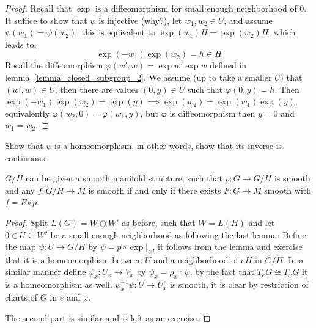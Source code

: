 \begin{proof}
	Recall that $\exp$ is a diffeomorphism for small enough neighborhood of $0$.
	It suffice to show that $\psi$ is injective (why?), let $w_1, w_2 \in U$, and assume $\psi(w_1) = \psi(w_2)$, this is equivalent to $\exp(w_1) H = \exp(w_2) H$, which leads to,
	\[
		\exp(-w_1) \exp(w_2)
		= h
		\in H
	\]
	Recall the diffeomorphism $\varphi(w', w) = \exp w' \exp w$ defined in lemma\ \ref{lemma_closed_subgroup_2}.
	We assume (up to take a smaller $U$) that $(w', w) \in U$, then there are values $(0, y) \in U$ such that $\varphi(0, y) = h$.
	Then $\exp(-w_1) \exp(w_2) = \exp(y) \implies \exp(w_2) = \exp(w_1) \exp(y)$, equivalently $\varphi(w_2, 0) = \varphi(w_1, y)$, but $\varphi$ is diffeomorphism then $y = 0$ and $w_1 = w_2$.
\end{proof}
\begin{exercise}
	Show that $\psi$ is a homeomorphism, in other words, show that its inverse is continuous.
\end{exercise}
\begin{proposition}
	$G / H$ can be given a smooth manifold structure, such that $p : G \to G / H$ is smooth and any $f : G / H \to M$ is smooth if and only if there exists $F : G \to M$ smooth with $f = F \circ p$.
\end{proposition}
\begin{proof}
	Split $L(G) = W \oplus W'$ as before, such that $W = L(H)$ and let $0 \in U \subseteq W'$ be a small enough neighborhood as following the last lemma.
	Define the map $\psi : U \to G / H$ by $\psi = p \circ \exp |_U$, it follows from the lemma and exercise that it is a homeomorphism between $U$ and a neighborhood of $e H$ in $G / H$.
	In a similar manner define $\psi_x : U_x \to V_x$ by $\psi_x = \rho_x \circ \psi$, by the fact that $T_e G \cong T_x G$ it is a homeomorphism as well.
	$\psi_x^{-1} \psi : U \to U_x$ is smooth, it is clear by restriction of charts of $G$ in $e$ and $x$.

	The second part is similar and is left as an exercise.
\end{proof}
